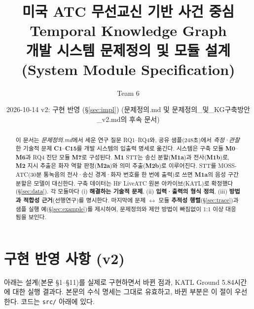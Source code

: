 \documentclass[10pt,a4paper]{article}
\title{\textbf{미국 ATC 무선교신 기반 사건 중심 Temporal Knowledge Graph}\\[2pt]
\large 개발 시스템 문제정의 및 모듈 설계 (System Module Specification)}
\author{Team 6}
\date{2026-10-14 \quad v2: 구현 반영 (\S\ref{sec:impl}) \quad (문제정의.md 및 문제정의\_및\_KG구축방안\_v2.md의 후속 문서)}
\newcommand{\ch}[1]{\textbf{\textcolor{red!60!black}{#1}}}
\newcommand{\md}[1]{\textbf{\textcolor{blue!60!black}{#1}}}
\begin{document}
\maketitle

\begin{abstract}
\noindent 이 문서는 \emph{문제정의.md}에서 세운 연구 질문 RQ1--RQ4와, 공유 샘플(248초)에서 \emph{측정·관찰}한 기술적 문제 \ch{C1}--\ch{C15}를 개발 시스템의 입출력 명세로 옮긴다.
시스템은 구축 모듈 \md{M0}--\md{M6}과 RQ4 진단 모듈 \md{M7}로 구성된다. \md{M1} STT는 송신 분할(\md{M1a})과 전사(\md{M1b})로, \md{M2} 지시 추출은 화자 역할 판정(\md{M2a})와 의미 추출(\md{M2b})로 이루어진다. STT를 MOSS-ATC(30분 통녹음의 전사·송신 경계·화자 번호를 한 번에 출력)로 쓰면 \md{M1a}의 음성 구간 분할은 모델이 대신한다. 구축 데이터는 HF LiveATC 원본 아카이브(KATL)로 확정했다(\S\ref{sec:data}).
각 모듈마다 (i) \textbf{해결하는 기술적 문제}, (ii) \textbf{입력·출력의 형식 정의}, (iii) \textbf{방법과 적합성 근거}(선행연구)를 명시한다.
마지막에 문제 $\leftrightarrow$ 모듈 \textbf{추적성 행렬}(\S\ref{sec:trace})과 샘플 실행 예(\S\ref{sec:example})를 제시하여, 문제정의와 제안 방법이 빠짐없이 1:1 이상 대응됨을 보인다.
\end{abstract}

\tableofcontents
\newpage

\section*{구현 반영 사항 (v2)}\label{sec:impl}
아래는 설계(본문 \S1--\S11)를 실제로 구현하면서 바뀐 점과, KATL Ground 5.84시간에 대한 실행 결과다. 본문의 수식 명세는 그대로 유효하고, 바뀐 부분은 이 절이 우선한다. 코드는 \texttt{src/} 아래에 있다.
\end{document}
